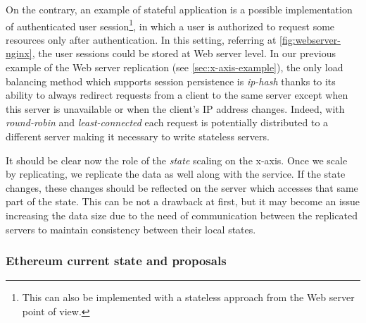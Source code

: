 On the contrary, an example of stateful application is a possible implementation
of authenticated user session\footnote{This can also be implemented with a
stateless approach from the Web server point of view.}, in which a user is
authorized to request some resources only after authentication. In this setting,
referring at \autoref{fig:webserver-nginx}, the user sessions could be stored at
Web server level. In our previous example of the Web server replication (see
\autoref{sec:x-axis-example}), the only load balancing method which supports
session persistence is \emph{ip-hash} thanks to its ability to always redirect
requests from a client to the same server except when this server is unavailable
or when the client's IP address changes. Indeed, with \emph{round-robin} and
\emph{least-connected} each request is potentially distributed to a different
server making it necessary to write stateless servers.

It should be clear now the role of the \emph{state} scaling on the x-axis. Once
we scale by replicating, we replicate the data as well along with the service.
If the state changes, these changes should be reflected on the server which
accesses that same part of the state. This can be not a drawback at first, but
it may become an issue increasing the data size due to the need of communication
between the replicated servers to maintain consistency between their local states.



\subsubsection{Ethereum current state and proposals}
\label{sec:x-axis-ethereum}

